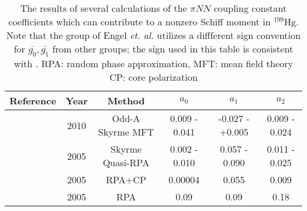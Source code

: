 \documentclass [10pt, twoside] {uwthesis}[2012/04/02]
\begin{document}
\begin{table}[t]  																
\begin{center} 																	
\caption[$\pi NN$ couplings parameterizing the Schiff moment]
{\narrower The results of several calculations of the $\pi NN$ coupling constant coefficients which can contribute to a nonzero Schiff moment in $^{199}$Hg. Note that the group of Engel \textit{et. al.} utilizes a diffferent sign convention for $\bar{g_0}, \bar{g_1}$ from other groups; the sign used in this table is consistent with \cite{2013_Engel_et_al_EDM_review}. RPA: random phase approximation, MFT: mean field theory CP: core polarization} \label{piNN}
\begin{tabular}{cccccc}															%
\hline \hline                													%
Reference & Year  & Method & $a_0$ & $a_1$ & $a_2$  \\ [0.5ex]					%
\hline  
\cite{2010_Engel_self-consistent_Schiff_moments} & 2010 & Odd-A Skyrme MFT & 0.009 - 0.041 & -0.027 - +0.005 & 0.009 - 0.024\\ 
\cite{2005_de_Jesus_and_Engel_Hg_Schiff_Moment} & 2005 & Skyrme Quasi-RPA & 0.002 - 0.010 & 0.057 - 0.090 & 0.011 - 0.025\\  
\cite{2005_Dmitriev_et._al._Core_Polarization_in_NSM} & 2005 & RPA+CP & 0.00004 & 0.055 & 0.009\\       \cite{2005_Dmitriev_et._al._Core_Polarization_in_NSM} & 2005 & RPA & 0.09 & 0.09 & 0.18\\
\hline
\hline 																			%
\end{tabular} 
\end{center} 														 
\end{table}	 
\end{document}
